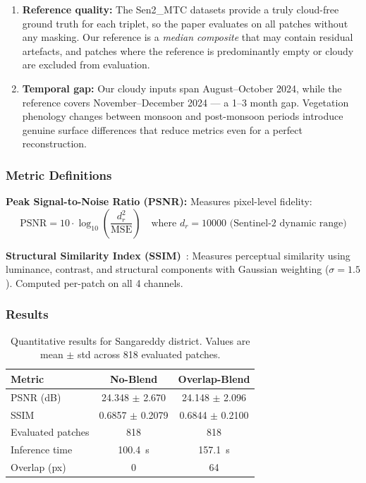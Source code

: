 \documentclass[12pt,a4paper]{article}
\begin{document}
\begin{enumerate}[leftmargin=2em]
    \item \textbf{Reference quality:} The Sen2\_MTC datasets provide a truly cloud-free ground truth for each triplet, so the paper evaluates on all patches without any masking. Our reference is a \textit{median composite} that may contain residual artefacts, and patches where the reference is predominantly empty or cloudy are excluded from evaluation.
    
    \item \textbf{Temporal gap:} Our cloudy inputs span August--October 2024, while the reference covers November--December 2024 --- a 1--3 month gap. Vegetation phenology changes between monsoon and post-monsoon periods introduce genuine surface differences that reduce metrics even for a perfect reconstruction.
\end{enumerate}

\subsubsection{Metric Definitions}

\textbf{Peak Signal-to-Noise Ratio (PSNR):} Measures pixel-level fidelity:
\begin{equation}
    \text{PSNR} = 10 \cdot \log_{10}\left(\frac{d_r^2}{\text{MSE}}\right) \quad \text{where } d_r = 10000 \text{ (Sentinel-2 dynamic range)}
\end{equation}

\textbf{Structural Similarity Index (SSIM)}~\cite{wang2004image}: Measures perceptual similarity using luminance, contrast, and structural components with Gaussian weighting ($\sigma = 1.5$). Computed per-patch on all 4 channels.

\subsubsection{Results}

\begin{table}[H]
\centering
\caption{Quantitative results for Sangareddy district. Values are mean $\pm$ std across 818 evaluated patches.}
\label{tab:results}
\begin{tabular}{lcc}
\toprule
\textbf{Metric} & \textbf{No-Blend} & \textbf{Overlap-Blend} \\
\midrule
PSNR (dB) & 24.348 $\pm$ 2.670 & 24.148 $\pm$ 2.096 \\
SSIM & 0.6857 $\pm$ 0.2079 & 0.6844 $\pm$ 0.2100 \\
Evaluated patches & 818 & 818 \\
Inference time & 100.4~s & 157.1~s \\
Overlap (px) & 0 & 64 \\
\bottomrule
\end{tabular}
\end{table}
\end{document}
